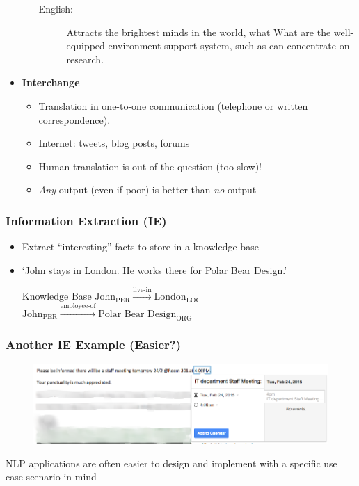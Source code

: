\begin{frame}[allowframebreaks]
\begin{itemize}
\begin{itemize}
\begin{description}
		\item[English:] Attracts the brightest minds in the world, what What are the well-equipped environment support system, such as can concentrate on research.
		\end{description}
	\end{itemize}
\framebreak
\item \textbf{Interchange}
	\begin{itemize}
	\item Translation in one-to-one communication (telephone or written correspondence).
	\item Internet: tweets, blog posts, forums
	\item Human translation is out of the question (too slow)!
	\item \emph{Any} output (even if poor) is better than \emph{no} output
	\end{itemize}
\end{itemize}
\end{frame}



\begin{frame}
\frametitle{Information Extraction (IE)} 

\begin{itemize}[<+->]
\item Extract ``interesting'' facts to store in a knowledge base 
\item `John stays in London. He works there for Polar Bear Design.'
	\begin{exampleblock}{Knowledge Base}
	$\text{John}_\text{PER} \xrightarrow{\text{live-in}} \text{London}_\text{LOC}$\\
	$\text{John}_\text{PER} \xrightarrow{\text{employee-of}} \text{Polar Bear Design}_\text{ORG}$
	\end{exampleblock}
\end{itemize}
\end{frame}


\begin{frame}
\frametitle{Another IE Example (Easier?)}
    
\begin{figure}
\centering
\includegraphics[width=\textwidth]{IE-event}
\end{figure}

NLP applications are often easier to design and implement with a specific use case scenario in mind

\end{frame}



